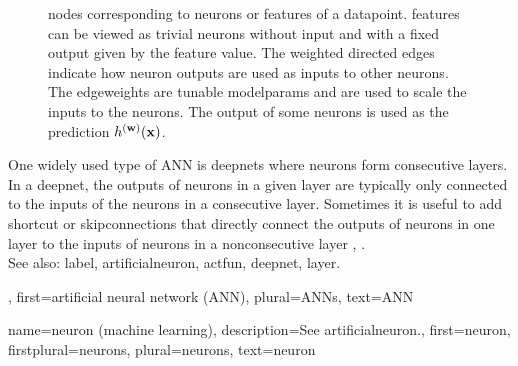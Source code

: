 {{\begin{figure}[H]
{			nodes corresponding to \glspl{neuron} or \glspl{feature} of a \gls{datapoint}. \Glspl{feature} 
			can be viewed as trivial \glspl{neuron} without input and with a fixed \gls{output} given by the 
			\gls{feature} value. The weighted directed edges indicate how \gls{neuron} \glspl{output} are used 
			as inputs to other \glspl{neuron}. The \glspl{edgeweight} are tunable \glspl{modelparam} and are 
			used to scale the inputs to the \glspl{neuron}. The \gls{output} of some \glspl{neuron} is used as the 
			\gls{prediction} $h^{({\bf w})}({\bf x})$. \label{fig_ANN_DAG_dict}}
 		\end{figure}
		One widely used type of ANN is \glspl{deepnet} 
		where \glspl{neuron} form consecutive \glspl{layer}. In a \gls{deepnet}, the 
		\glspl{output} of \glspl{neuron} in a given \gls{layer} are typically only connected 
		to the inputs of the \glspl{neuron} in a consecutive \gls{layer}. Sometimes it 
		is useful to add shortcut or \glspl{skipconnection} that directly connect the \glspl{output} of 
		\glspl{neuron} in one \gls{layer} to the inputs of \glspl{neuron} in a nonconsecutive \gls{layer} 
		\cite{Goodfellow-et-al-2016}, \cite{HeResidual2016}.	
		\\
		See also: \gls{label}, \gls{artificialneuron}, \gls{actfun}, \gls{deepnet}, \gls{layer}.},
	first={artificial neural network (ANN)},
	plural={ANNs},
	text={ANN}
}

{name={neuron (machine learning)},
	description={See \gls{artificialneuron}.},
	first={neuron},
	firstplural={neurons},
	plural={neurons},
	text={neuron}
}

